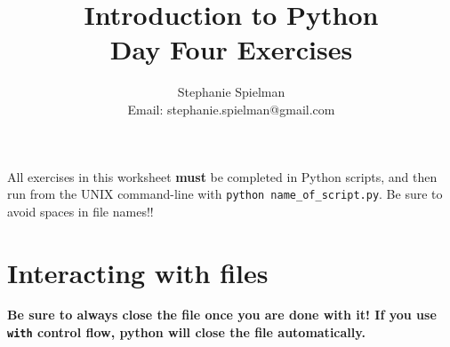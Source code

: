 \documentclass{article}[12pt]
\newcommand{\code}[1]{\texttt{#1}}  %
\begin{document}
\title{Introduction to Python \\ Day Four Exercises}
\author{Stephanie Spielman \\ \footnotesize{Email: stephanie.spielman@gmail.com}}
\date{}
\maketitle{}


All exercises in this worksheet \textbf{must} be completed in Python scripts, and then run from the UNIX command-line with \code{python name\_of\_script.py}. Be sure to avoid spaces in file names!!

\section{Interacting with files}

\textbf{Be sure to always close the file once you are done with it! If you use \code{with} control flow, python will close the file automatically.}
\end{document}

